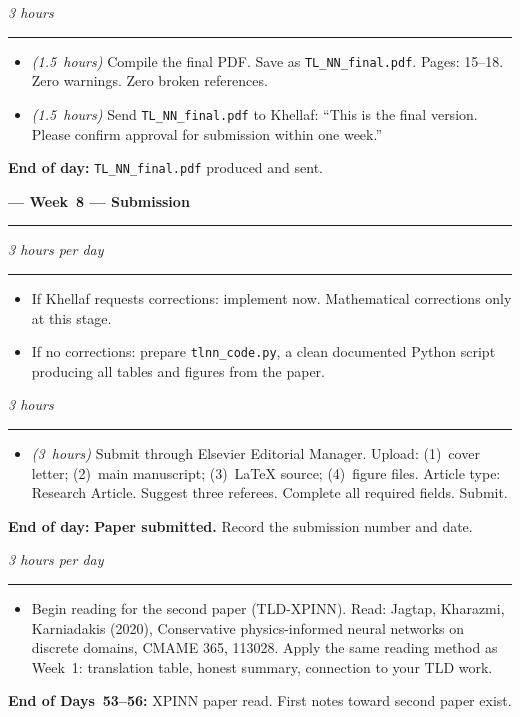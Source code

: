 \documentclass[12pt,a4paper]{article}
\newcommand{\hrs}[1]{\textit{\color{darkgray}(#1~hours)}}
\newcommand{\weekheading}[2]{%
  \vspace{0.8em}
  \noindent
  {\large\bfseries\color{midblue}--- Week~#1 ---
  \hfill\normalsize\normalfont\color{darkgray}#2}
  \vspace{0.2em}
  \\{\color{midblue}\rule{\linewidth}{0.6pt}}
  \vspace{0.3em}
}
\newcommand{\dayheading}[2]{%
  \vspace{0.3em}
  \noindent{\bfseries\color{darkblue}Day~#1}%
  \hfill{\small\color{darkgray}\textit{#2}}%
  \\[-0.4em]{\color{midgray}\rule{\linewidth}{0.4pt}}%
  \vspace{0.1em}
}
\begin{document}
\begin{tcolorbox}[daystyle]
\dayheading{48}{3 hours}
\begin{itemize}[leftmargin=1.8em,itemsep=3pt]
  \item[\color{midblue}$\bullet$]
    \hrs{1.5} Compile the final PDF. Save as
    \texttt{TL\_NN\_final.pdf}. Pages: 15--18. Zero
    warnings. Zero broken references.
  \item[\color{midblue}$\bullet$]
    \hrs{1.5} Send \texttt{TL\_NN\_final.pdf} to Khellaf:
    ``This is the final version. Please confirm approval
    for submission within one week.''
\end{itemize}
\noindent\textbf{End of day:}
\texttt{TL\_NN\_final.pdf} produced and sent.
\end{tcolorbox}

\weekheading{8}{Submission}

\begin{tcolorbox}[daystyle]
\dayheading{49--51}{3 hours per day}
\begin{itemize}[leftmargin=1.8em,itemsep=3pt]
  \item[\color{midblue}$\bullet$]
    If Khellaf requests corrections: implement now.
    Mathematical corrections only at this stage.
  \item[\color{midblue}$\bullet$]
    If no corrections: prepare \texttt{tlnn\_code.py},
    a clean documented Python script producing all
    tables and figures from the paper.
\end{itemize}
\end{tcolorbox}

\begin{tcolorbox}[daystyle]
\dayheading{52}{3 hours}
\begin{itemize}[leftmargin=1.8em,itemsep=3pt]
  \item[\color{midblue}$\bullet$]
    \hrs{3} Submit through Elsevier Editorial Manager.
    Upload: (1)~cover letter; (2)~main manuscript;
    (3)~\LaTeX{} source; (4)~figure files.
    Article type: Research Article. Suggest three
    referees. Complete all required fields. Submit.
\end{itemize}
\noindent\textbf{End of day:}
\textbf{\color{darkred}Paper submitted.}
Record the submission number and date.
\end{tcolorbox}

\begin{tcolorbox}[daystyle]
\dayheading{53--56}{3 hours per day}
\begin{itemize}[leftmargin=1.8em,itemsep=3pt]
  \item[\color{midblue}$\bullet$]
    Begin reading for the second paper (TLD-XPINN).
    Read: Jagtap, Kharazmi, Karniadakis (2020),
    Conservative physics-informed neural networks on
    discrete domains, CMAME 365, 113028.
    Apply the same reading method as Week~1: translation
    table, honest summary, connection to your TLD work.
\end{itemize}
\noindent\textbf{End of Days~53--56:}
XPINN paper read. First notes toward second paper exist.
\end{tcolorbox}
\end{document}
